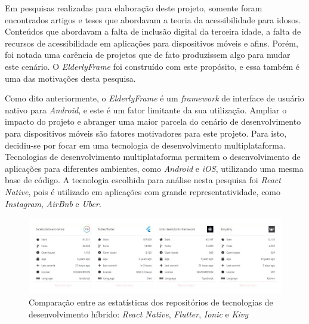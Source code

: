 \documentclass[
	12pt,				    %
	openright,			    %
	oneside,			    %
	a4paper,			    %
    sumario=tradicional,    %
	english,			    %
	brazil,				    %
	]{abntex2}              %
\begin{document}
\par

Em pesquisas realizadas para elaboração deste projeto, somente foram encontrados artigos e teses que abordavam a teoria da acessibilidade para idosos. Conteúdos que abordavam a falta de inclusão digital da terceira idade,  a falta de recursos de acessibilidade em aplicações para dispositivos móveis e afins. Porém, foi notada uma carência de projetos que de fato produzissem algo para mudar este cenário. O \textit{ElderlyFrame} foi construído com este propósito, e essa também é uma das motivações desta pesquisa.

\par

Como dito anteriormente, o \textit{ElderlyFrame} é um \textit{framework} de interface de usuário nativo para \textit{Android}, e este é um fator limitante da sua utilização. Ampliar o impacto do projeto e abranger uma maior parcela do cenário de desenvolvimento para dispositivos móveis são fatores motivadores para este projeto. Para isto, decidiu-se por focar em uma tecnologia de desenvolvimento multiplataforma. Tecnologias de desenvolvimento multiplataforma permitem o desenvolvimento de aplicações para diferentes ambientes, como \emph{Android} e \emph{iOS}, utilizando uma mesma base de código. A tecnologia escolhida para análise nesta pesquisa foi \textit{React Native}, pois é utilizado em aplicações com grande representatividade, como \textit{Instagram}, \textit{AirBnb} e \textit{Uber}.

\begin{figure}[H]
	\begin{center}
		\includegraphics[width=1\linewidth]{github-compare.png}
	\end{center}
	\caption[GitHub Compare]{Comparação entre as estatísticas dos repositórios de tecnologias de desenvolvimento híbrido: \textit{React Native}, \textit{Flutter}, \textit{Ionic} e \textit{Kivy}}
	\label{fig:githubCompare}
\end{figure}
\end{document}
